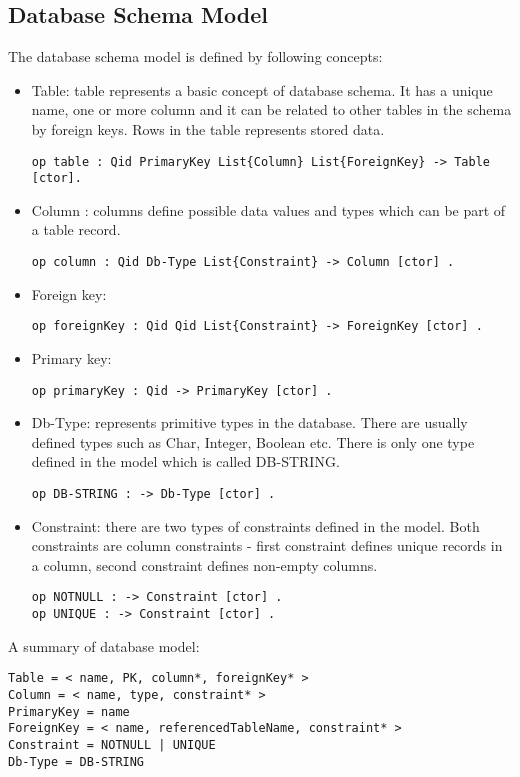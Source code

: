 \documentclass[11pt]{article}
\begin{document}
\subsection{Database Schema Model}
The database schema model is defined by following concepts:
\begin{itemize}
	\item Table: table represents a basic concept of database schema. It has a unique name, one or more column and it can be related to other tables in the schema by foreign keys. Rows in the table represents stored data.
	\begin{verbatim}
op table : Qid PrimaryKey List{Column} List{ForeignKey} -> Table [ctor].
	\end{verbatim}
	\item Column : columns define possible data values and types which can be part of a table record.
	\begin{verbatim}
op column : Qid Db-Type List{Constraint} -> Column [ctor] .
	\end{verbatim}

	\item Foreign key:
	\begin{verbatim}
op foreignKey : Qid Qid List{Constraint} -> ForeignKey [ctor] .
	\end{verbatim}

	\item Primary key:
	\begin{verbatim}
op primaryKey : Qid -> PrimaryKey [ctor] . 	
	\end{verbatim}

	\item Db-Type: represents primitive types in the database. There are usually defined types such as Char, Integer, Boolean etc. There is only one type defined in the model which is called DB-STRING.
	\begin{verbatim}
op DB-STRING : -> Db-Type [ctor] .
	\end{verbatim}

	\item Constraint: there are two types of constraints defined in the model. Both constraints are column constraints - first constraint defines unique records in a column, second constraint defines non-empty columns.
	\begin{verbatim}
op NOTNULL : -> Constraint [ctor] .
op UNIQUE : -> Constraint [ctor] .
	\end{verbatim}
\end{itemize}
A summary of database model:
\begin{verbatim}
Table = < name, PK, column*, foreignKey* >	
Column = < name, type, constraint* >
PrimaryKey = name
ForeignKey = < name, referencedTableName, constraint* >
Constraint = NOTNULL | UNIQUE 
Db-Type = DB-STRING
\end{verbatim}
\end{document}
